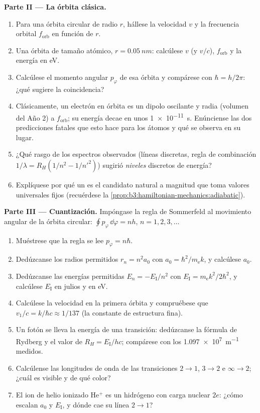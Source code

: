 \begin{problem}
\medskip\noindent\textbf{Parte II --- La órbita clásica.}
\begin{enumerate}[resume]
  \item Para una órbita circular de radio $r$, hállese la velocidad $v$ y la
        frecuencia orbital $f_{\text{orb}}$ en función de $r$.
  \item Una órbita de tamaño atómico, $r = \qty{0.05}{nm}$: calcúlese $v$
        (y $v/c$), $f_{\text{orb}}$ y la energía en eV.
  \item Calcúlese el momento angular $p_\varphi$ de esa órbita y
        compárese con $\hbar = h/2\pi$: ¿qué sugiere la coincidencia?
  \item Clásicamente, un electrón en órbita es un dipolo oscilante y
        radia (volumen del Año 2) a $f_{\text{orb}}$; su energía decae
        en unos \qty{1e-11}{s}. Enúnciense las dos predicciones fatales
        que esto hace para los átomos y qué se observa en su lugar.
  \item ¿Qué rasgo de los espectros observados (líneas discretas, regla
        de combinación $1/\lambda = R_H(1/n^2 - 1/n'^2)$) sugirió
        \emph{niveles} discretos de energía?
  \item Explíquese por qué un \emph{} es el candidato
        natural a magnitud que toma valores universales fijos
        (recuérdese la \cref{prop:b3:hamiltonian-mechanics:adiabatic}).
\end{enumerate}

\medskip\noindent\textbf{Parte III --- Cuantización.}
Impóngase la regla de Sommerfeld al movimiento angular de la órbita
circular: $\oint p_\varphi\,\dd\varphi = nh$, $n = 1, 2, 3, \dots$
\begin{enumerate}[resume]
  \item Muéstrese que la regla se lee $p_\varphi = n\hbar$.
  \item Dedúzcanse los radios permitidos $r_n = n^2a_0$ con $a_0 =
        \hbar^2/m_{\text{e}}k$, y calcúlese $a_0$.
  \item Dedúzcanse las energías permitidas $E_n = -E_{\text{I}}/n^2$ con
        $E_{\text{I}} = m_{\text{e}}k^2/2\hbar^2$, y calcúlese
        $E_{\text{I}}$ en julios y en eV.
  \item Calcúlese la velocidad en la primera órbita y compruébese que $v_1/c =
        k/\hbar c \approx 1/137$ (la constante de estructura fina).
  \item Un fotón se lleva la energía de una transición: dedúzcanse la
        fórmula de Rydberg y el valor de $R_H = E_{\text{I}}/hc$;
        compárese con los \qty{1.097e7}{m^{-1}} medidos.
  \item Calcúlense las longitudes de onda de las transiciones $2 \to 1$,
        $3 \to 2$ e $\infty \to 2$; ¿cuál es visible y de qué color?
  \item El ion de helio ionizado He$^+$ es un hidrógeno con carga nuclear
        $2e$: ¿cómo escalan $a_0$ y $E_{\text{I}}$, y dónde cae
        su línea $2 \to 1$?
\end{enumerate}


\end{problem}
